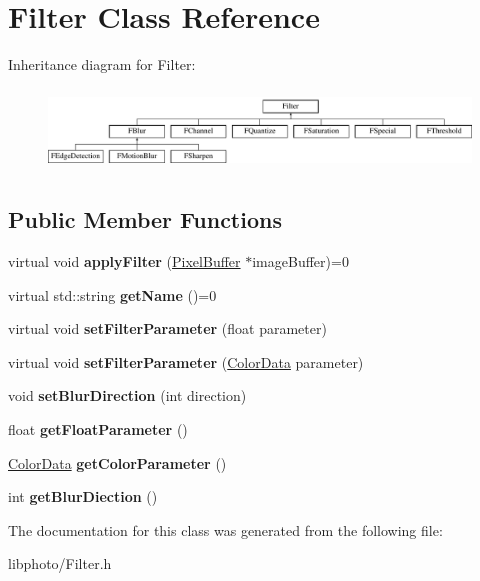 \hypertarget{classFilter}{\section{Filter Class Reference}
\label{classFilter}
}
Inheritance diagram for Filter\-:\begin{figure}[H]
\begin{center}
\leavevmode
\includegraphics[height=2.181818cm]{classFilter}
\end{center}
\end{figure}
\subsection*{Public Member Functions}
\begin{DoxyCompactItemize}
\item 
\hypertarget{classFilter_a2ecb4bc0e81851d30f46f30bf81d1739}{virtual void {\bfseries apply\-Filter} (\hyperlink{classPixelBuffer}{Pixel\-Buffer} $\ast$image\-Buffer)=0}\label{classFilter_a2ecb4bc0e81851d30f46f30bf81d1739}

\item 
\hypertarget{classFilter_a212f40acb6481b2e36c3d129007519f1}{virtual std\-::string {\bfseries get\-Name} ()=0}\label{classFilter_a212f40acb6481b2e36c3d129007519f1}

\item 
\hypertarget{classFilter_aba015e9da647ba41fee4b41019d54516}{virtual void {\bfseries set\-Filter\-Parameter} (float parameter)}\label{classFilter_aba015e9da647ba41fee4b41019d54516}

\item 
\hypertarget{classFilter_a88314088e678c9a7cdbe0d0557385fa8}{virtual void {\bfseries set\-Filter\-Parameter} (\hyperlink{classColorData}{Color\-Data} parameter)}\label{classFilter_a88314088e678c9a7cdbe0d0557385fa8}

\item 
\hypertarget{classFilter_ada9d5f112e217c9bcf413093eae2a1e9}{void {\bfseries set\-Blur\-Direction} (int direction)}\label{classFilter_ada9d5f112e217c9bcf413093eae2a1e9}

\item 
\hypertarget{classFilter_a9f741b045bf1d57e485f116ce62ebac1}{float {\bfseries get\-Float\-Parameter} ()}\label{classFilter_a9f741b045bf1d57e485f116ce62ebac1}

\item 
\hypertarget{classFilter_abf85cdf0cda6dbe1dbcd6b8813aeecf3}{\hyperlink{classColorData}{Color\-Data} {\bfseries get\-Color\-Parameter} ()}\label{classFilter_abf85cdf0cda6dbe1dbcd6b8813aeecf3}

\item 
\hypertarget{classFilter_a465a168fc580c773e58d4df2f3db5968}{int {\bfseries get\-Blur\-Diection} ()}\label{classFilter_a465a168fc580c773e58d4df2f3db5968}

\end{DoxyCompactItemize}


The documentation for this class was generated from the following file\-:\begin{DoxyCompactItemize}
\item 
libphoto/Filter.\-h\end{DoxyCompactItemize}
